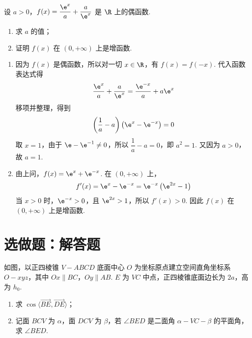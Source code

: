 \begin{problem}
设 \(a>0\)，\(f(x)=\dfrac{\e^x}{a}+\dfrac{a}{\e^x}\) 是 \(\R\) 上的偶函数.

\begin{enumerate}
\item 求 \(a\) 的值；
\item 证明 \(f(x)\) 在 \((0,+\infty)\) 上是增函数.
\end{enumerate}
\end{problem}

\begin{solution}
\begin{enumerate}
\item 因为 \(f(x)\) 是偶函数，所以对一切 \(x\in\R\)，有 \(f(x)=f(-x)\). 代入函数表达式得
\[
\frac{\e^x}{a}+\frac{a}{\e^x}=\frac{\e^{-x}}{a}+a\e^x
\]
移项并整理，得到
\[
\left(\frac1a-a\right)\left(\e^x-\e^{-x}\right)=0
\]
取 \(x=1\)，由于 \(\e-\e^{-1}\ne0\)，所以 \(\dfrac1a-a=0\)，即 \(a^2=1\). 又因为 \(a>0\)，故 \(a=1\).

\item 由上问，\(f(x)=\e^x+\e^{-x}\). 在 \((0,+\infty)\) 上，
\[
f'(x)=\e^x-\e^{-x}=\e^{-x}\left(\e^{2x}-1\right)
\]
当 \(x>0\) 时，\(\e^{-x}>0\)，且 \(\e^{2x}>1\)，所以 \(f'(x)>0\). 因此 \(f(x)\) 在 \((0,+\infty)\) 上是增函数.
\end{enumerate}
\end{solution}

\section{选做题：解答题}

\begin{problem}[甲]
如图，以正四棱锥 \(V-ABCD\) 底面中心 \(O\) 为坐标原点建立空间直角坐标系 \(O-xyz\)，其中 \(Ox\parallel BC\)，\(Oy\parallel AB\). \(E\) 为 \(VC\) 中点，正四棱锥底面边长为 \(2a\)，高为 \(h_0\).

\begin{enumerate}
\item 求 \(\cos\langle\overrightarrow{BE},\overrightarrow{DE}\rangle\)；
\item 记面 \(BCV\) 为 \(\alpha\)，面 \(DCV\) 为 \(\beta\)，若 \(\angle BED\) 是二面角 \(\alpha-VC-\beta\) 的平面角，求 \(\angle BED\).
\end{enumerate}

\end{problem}

